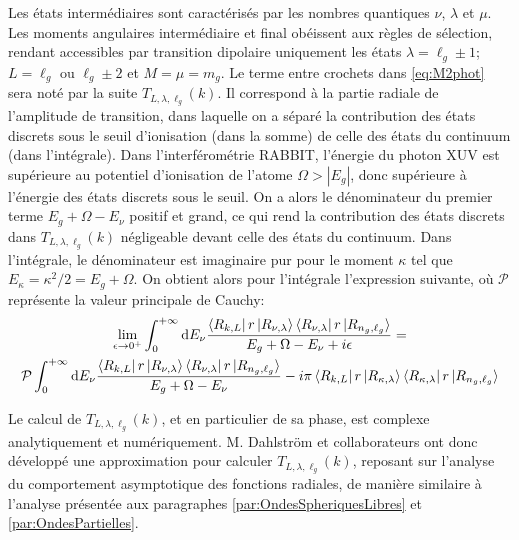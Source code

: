 Les états intermédiaires sont caractérisés par les nombres quantiques $\nu$, $\lambda$ et $\mu$. Les moments angulaires intermédiaire et final obéissent aux règles de sélection, rendant accessibles par transition dipolaire uniquement les états $\lambda = \ell_g \pm 1$; $L = \ell_g$ ou $\ell_g \pm 2$ et $M = \mu = m_g$. Le terme entre crochets dans \ref{eq:M2phot} sera noté par la suite $T_{L,\lambda,\ell_g}(k)$. Il correspond à la partie radiale de l'amplitude de transition, dans laquelle on a séparé la contribution des états discrets sous le seuil d'ionisation (dans la somme) de celle des états du continuum (dans l'intégrale). Dans l'interférométrie RABBIT, l'énergie du photon XUV est supérieure au potentiel d'ionisation de l'atome $\Omega > |E_g|$, donc supérieure à l'énergie des états discrets sous le seuil. On a alors le dénominateur du premier terme $E_g + \Omega - E_\nu$ positif et grand, ce qui rend la contribution des états discrets dans $T_{L,\lambda,\ell_g}(k)$ négligeable devant celle des états du continuum. Dans l'intégrale, le dénominateur est imaginaire pur pour le moment $\kappa$ tel que $E_\kappa = \kappa^2 / 2 = E_g + \Omega$. On obtient alors pour l'intégrale l'expression suivante, où $ \mathcal{P}$ représente la valeur principale de Cauchy:
\begin{multline}
 \lim \limits_{\epsilon \rightarrow 0^+} \int_{0}^{+\infty} \mathrm{d} E_\nu \frac{\bra{R_{k,L}} r \ket{R_{\nu,\lambda}} \bra{R_{\nu,\lambda}} r \ket{R_{n_g,\ell_g}}} {E_g + \Omega - E_{\nu} +i \epsilon} = \\
 \mathcal{P} \int_{0}^{+\infty} \mathrm{d} E_\nu \frac{\bra{R_{k,L}} r \ket{R_{\nu,\lambda}} \bra{R_{\nu,\lambda}} r \ket{R_{n_g,\ell_g}}} {E_g + \Omega - E_{\nu}} - i \pi \bra{R_{k,L}} r \ket{R_{\kappa,\lambda}} \bra{R_{\kappa,\lambda}} r \ket{R_{n_g,\ell_g}}
\end{multline}

Le calcul de $T_{L,\lambda,\ell_g}(k)$, et en particulier de sa phase, est complexe analytiquement et numériquement. M. Dahlström et collaborateurs  ont donc développé une approximation pour calculer $T_{L,\lambda,\ell_g}(k)$, reposant sur l'analyse du comportement asymptotique des fonctions radiales, de manière similaire à l'analyse présentée aux paragraphes \ref{par:OndesSpheriquesLibres} et  \ref{par:OndesPartielles}.


